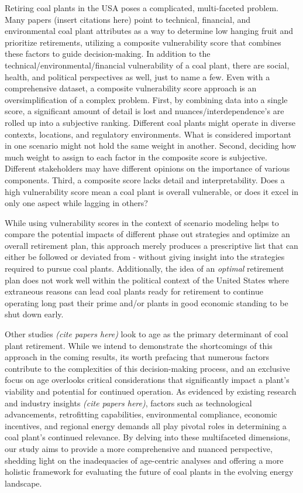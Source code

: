 Retiring coal plants in the USA poses a complicated, multi-faceted problem. Many papers (insert citations here) point to technical, financial, and environmental 
coal plant attributes as a way to determine low hanging fruit and prioritize retirements, utilizing a composite vulnerability score that combines these factors to guide 
decision-making. In addition to the technical/environmental/financial vulnerability of a coal plant, there are social, health, and political perspectives as well, just 
to name a few. Even with a comprehensive dataset, a composite vulnerability score approach is an oversimplification of a complex problem. 
First, by combining data into a single score, a significant amount of detail is lost and nuances/interdependence's are rolled up into a subjective 
ranking. Different coal plants might operate in diverse contexts, locations, and regulatory environments. What is considered important in 
one scenario might not hold the same weight in another. Second, deciding how much weight to assign to each factor in the composite score is subjective. Different stakeholders may have 
different opinions on the importance of various components. Third, a composite score lacks detail and interpretability. Does a high vulnerability score mean a coal plant is 
overall vulnerable, or does it excel in only one aspect while lagging in others?

While using vulnerability scores in the context of scenario modeling helps to compare the potential impacts of different phase out strategies and 
optimize an overall retirement plan, this approach merely produces a prescriptive list that can either be followed or deviated from - without giving 
insight into the strategies required to pursue coal plants. Additionally, the idea of an \textit{optimal} retirement plan does not work well 
within the political context of the United States where extraneous reasons can lead coal plants ready for retirement to continue operating long 
past their prime and/or plants in good economic standing to be shut down early.

Other studies \textit{(cite papers here)} look to age as the primary determinant of coal plant retirement. While we intend to demonstrate the shortcomings of this approach 
in the coming results, its worth prefacing that numerous factors contribute to the complexities of this decision-making process, and an exclusive focus on age overlooks 
critical considerations that significantly impact a plant's viability and potential for continued operation. As evidenced by existing research and industry insights \textit{(cite papers here)}, 
factors such as technological advancements, retrofitting capabilities, environmental compliance, economic incentives, and regional energy demands all play pivotal roles 
in determining a coal plant's continued relevance. By delving into these multifaceted dimensions, our study aims to provide a more comprehensive and nuanced perspective, 
shedding light on the inadequacies of age-centric analyses and offering a more holistic framework for evaluating the future of coal plants in the evolving energy landscape.




